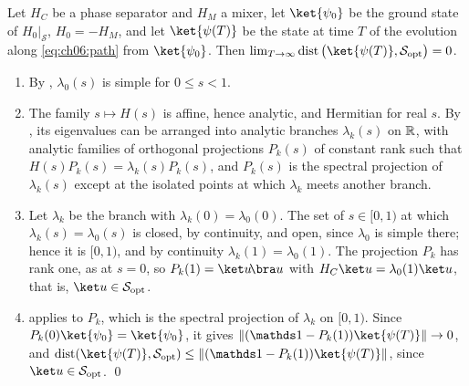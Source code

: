 \documentclass[handoutsbeamer.tex]{subfiles}
\begin{document}
\begin{frame}
\onp{\scriptsize}
\begin{thm}\label{thm:ch06:qaa}
Let $H_C$ be a phase separator and $H_M$ a mixer, let $\ket{\psi_0}$ be the ground state of $H_0|_{\mathcal S}$, $H_0 = -H_M$, and let $\ket{\psi(T)}$ be the state at time $T$ of the evolution along \eqref{eq:ch06:path} from $\ket{\psi_0}$. Then $\lim_{T\to\infty}\dist\big(\ket{\psi(T)},\mathcal S_{\rm opt}\big) = 0$.
\end{thm}
\begin{enumerate}\setlength\itemsep{0.1em}
    \item By , $\lambda_0(s)$ is simple for $0\le s<1$.
    \item The family $s\mapsto H(s)$ is affine, hence analytic, and Hermitian for real $s$. By , its eigenvalues can be arranged into analytic branches $\lambda_k(s)$ on $\mathbb{R}$, with analytic families of orthogonal projections $P_k(s)$ of constant rank such that $H(s)P_k(s) = \lambda_k(s)P_k(s)$, and $P_k(s)$ is the spectral projection of $\lambda_k(s)$ except at the isolated points at which $\lambda_k$ meets another branch.
    \item Let $\lambda_k$ be the branch with $\lambda_k(0) = \lambda_0(0)$. The set of $s\in[0,1)$ at which $\lambda_k(s) = \lambda_0(s)$ is closed, by continuity, and open, since $\lambda_0$ is simple there; hence it is $[0,1)$, and by continuity $\lambda_k(1) = \lambda_0(1)$. The projection $P_k$ has rank one, as at $s = 0$, so $P_k(1) = \ket u\!\bra u$ with $H_C\ket u = \lambda_0(1)\ket u$, that is, $\ket u\in\mathcal S_{\rm opt}$.
    \item {} applies to $P_k$, which is the spectral projection of $\lambda_k$ on $[0,1)$. Since $P_k(0)\ket{\psi_0} = \ket{\psi_0}$, it gives $\|(\one - P_k(1))\ket{\psi(T)}\|\to0$, and $\dist(\ket{\psi(T)},\mathcal S_{\rm opt})\le\|(\one - P_k(1))\ket{\psi(T)}\|$, since $\ket u\in\mathcal S_{\rm opt}$. \qed
\end{enumerate}
\end{frame}
\end{document}
